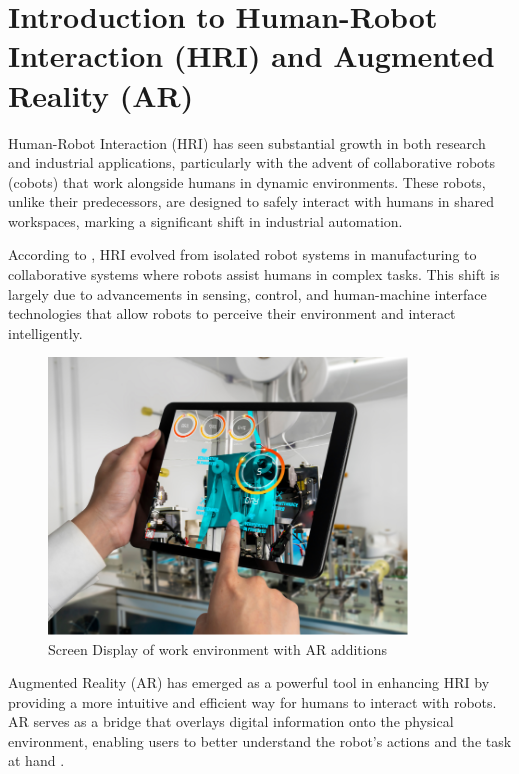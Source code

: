 \section{Introduction to Human-Robot Interaction (HRI) and Augmented Reality (AR)}

Human-Robot Interaction (HRI) has seen substantial growth in both research and industrial applications, particularly with the advent of collaborative robots (cobots) that work alongside humans in dynamic environments. These robots, unlike their predecessors, are designed to safely interact with humans in shared workspaces, marking a significant shift in industrial automation. 

According to \cite{Hentout2019}, HRI evolved from isolated robot systems in manufacturing to collaborative systems where robots assist humans in complex tasks. This shift is largely due to advancements in sensing, control, and human-machine interface technologies that allow robots to perceive their environment and interact intelligently.

\begin{figure}[ht]
    \centering
    \includegraphics[width=0.85\textwidth]{ch2/figs/overlay.png}
    \caption{Screen Display of work environment with AR additions {\cite{ResearchGateAR2024}}}
    \label{fig:AR_work_overlay}
\end{figure}

Augmented Reality (AR) has emerged as a powerful tool in enhancing HRI by providing a more intuitive and efficient way for humans to interact with robots. AR serves as a bridge that overlays digital information onto the physical environment, enabling users to better understand the robot’s actions and the task at hand \cite{Suzuki2022}. 

